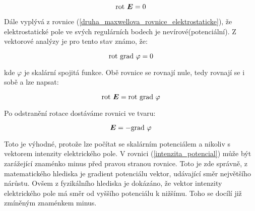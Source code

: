 \begin{equation}
	\mathrm{rot}\  \mbox{\boldmath$E$} =  0
	\label{druha_maxwellova_rovnice_elektrostaticke}
\end{equation}

Dále vyplývá z rovnice (\ref{druha_maxwellova_rovnice_elektrostaticke}), že elektrostatické pole ve svých regulárních bodech  je nevírové(potenciální). Z vektorové analýzy je pro tento stav známo, že:

\begin{equation}
	\mathrm{rot}\  \mathrm{grad}\  \varphi =  0
	\label{rotace_gradientu_potencialu}
\end{equation}

kde $\varphi$ je skalární spojitá funkce. Obě rovnice se rovnají nule, tedy rovnají se i sobě a lze napsat:

\begin{equation}
	\mathrm{rot}\  \mbox{\boldmath$E$} =  \mathrm{rot}\  \mathrm{grad}\  \varphi
	\label{druha_maxwellova_rovnice_potencial}
\end{equation}

Po odstranění rotace dostáváme rovnici ve tvaru:

\begin{equation}
	\mbox{\boldmath$E$} =  - \mathrm{grad}\  \varphi
	\label{intenzita_potencial}
\end{equation}

Toto je výhodné, protože lze počítat se skalárním potenciálem a nikoliv s vektorem intenzity elektrického pole. V rovnici (\ref{intenzita_potencial}) může být zarážející znaménko minus před pravou stranou rovnice. Toto je zde správně, z matematického hlediska je gradient potenciálu vektor, udávající směr největšího nárůstu. Ovšem z fyzikálního hlediska je dokázáno, že vektor intenzity elektrického pole má směr od vyššího potenciálu k nižšímu. Toho se docílí již zmíněným znaménkem minus.  